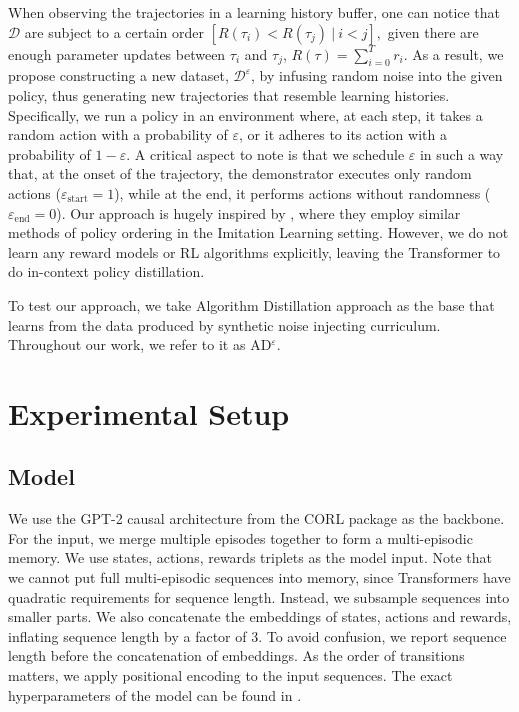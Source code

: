 \documentclass{article}
\theoremstyle{plain}
\theoremstyle{definition}
\theoremstyle{remark}
\begin{document}
When observing the trajectories in a learning history buffer, one can notice that  $\mathcal{D}$ are subject to a certain order $\left[R(\tau_i) < R(\tau_j) \ | \ i < j \right],$ given there are enough parameter updates between $\tau_i$ and $\tau_j$, $R(\tau) = \sum_{i=0}^{T}{r_i}$. As a result, we propose constructing a new dataset, $\mathcal{D}^{\varepsilon}$, by infusing random noise into the given policy, thus generating new trajectories that resemble learning histories. Specifically, we run a policy in an environment where, at each step, it takes a random action with a probability of $\varepsilon$, or it adheres to its action with a probability of $1 - \varepsilon$. A critical aspect to note is that we schedule $\varepsilon$ in such a way that, at the onset of the trajectory, the demonstrator executes only random actions ($\varepsilon_\textrm{start} = 1$), while at the end, it performs actions without randomness ($\varepsilon_\textrm{end} = 0$). Our approach is hugely inspired by \citet{brown2020better}, where they employ similar methods of policy ordering in the Imitation Learning setting. However, we do not learn any reward models or RL algorithms explicitly, leaving the Transformer to do in-context policy distillation.

To test our approach, we take Algorithm Distillation \cite{laskin2022context} approach as the base that learns from the data produced by synthetic noise injecting curriculum. Throughout our work, we refer to it as AD${^\varepsilon}$.

\section{Experimental Setup}
\subsection{Model}
We use the GPT-2 causal architecture \cite{radford2019language} from the CORL package \cite{tarasov2022corl} as the backbone. For the input, we merge multiple episodes together to form a multi-episodic memory. We use states, actions, rewards triplets as the model input. Note that we cannot put full multi-episodic sequences into memory, since Transformers have quadratic requirements for sequence length. Instead, we subsample sequences into smaller parts. We also concatenate the embeddings of states, actions and rewards, inflating sequence length by a factor of 3. To avoid confusion, we report sequence length before the concatenation of embeddings. As the order of transitions matters, we apply positional encoding to the input sequences. The exact hyperparameters of the model can be found in .
\end{document}
